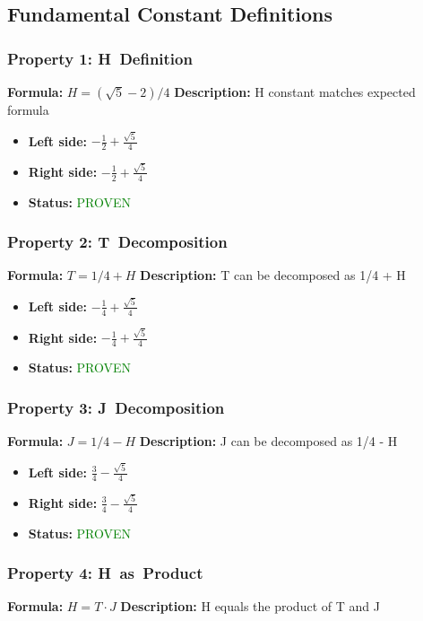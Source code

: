 \subsection{Fundamental Constant Definitions}

\subsubsection*{Property 1: H~Definition}
\textbf{Formula:} $H = (\sqrt{5} - 2)/4$
\textbf{Description:} H constant matches expected formula

\begin{itemize}
\item \textbf{Left side:} $- \frac{1}{2} + \frac{\sqrt{5}}{4}$
\item \textbf{Right side:} $- \frac{1}{2} + \frac{\sqrt{5}}{4}$
\item \textbf{Status:} \textcolor{green}{PROVEN}
\end{itemize}

\subsubsection*{Property 2: T~Decomposition}
\textbf{Formula:} $T = 1/4 + H$
\textbf{Description:} T can be decomposed as 1/4 + H

\begin{itemize}
\item \textbf{Left side:} $- \frac{1}{4} + \frac{\sqrt{5}}{4}$
\item \textbf{Right side:} $- \frac{1}{4} + \frac{\sqrt{5}}{4}$
\item \textbf{Status:} \textcolor{green}{PROVEN}
\end{itemize}

\subsubsection*{Property 3: J~Decomposition}
\textbf{Formula:} $J = 1/4 - H$
\textbf{Description:} J can be decomposed as 1/4 - H

\begin{itemize}
\item \textbf{Left side:} $\frac{3}{4} - \frac{\sqrt{5}}{4}$
\item \textbf{Right side:} $\frac{3}{4} - \frac{\sqrt{5}}{4}$
\item \textbf{Status:} \textcolor{green}{PROVEN}
\end{itemize}

\subsubsection*{Property 4: H~as~Product}
\textbf{Formula:} $H = T \cdot J$
\textbf{Description:} H equals the product of T and J

